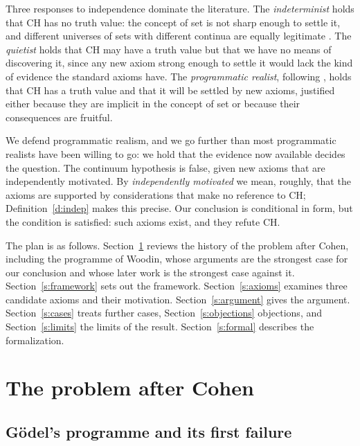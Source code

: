 \documentclass{situationist-preprint}
\begin{document}
Three responses to independence dominate the literature. The \emph{indeterminist} holds that CH has no truth value: the concept of set is not sharp enough to settle it, and different universes of sets with different continua are equally legitimate \citep{Hamkins2012}. The \emph{quietist} holds that CH may have a truth value but that we have no means of discovering it, since any new axiom strong enough to settle it would lack the kind of evidence the standard axioms have. The \emph{programmatic realist}, following \citet{Godel1947}, holds that CH has a truth value and that it will be settled by new axioms, justified either because they are implicit in the concept of set or because their consequences are fruitful.

We defend programmatic realism, and we go further than most programmatic realists have been willing to go: we hold that the evidence now available decides the question. The continuum hypothesis is false, given new axioms that are independently motivated. By \emph{independently motivated} we mean, roughly, that the axioms are supported by considerations that make no reference to CH; Definition~\ref{d:indep} makes this precise. Our conclusion is conditional in form, but the condition is satisfied: such axioms exist, and they refute CH.

The plan is as follows. Section~\ref{s:history} reviews the history of the problem after Cohen, including the programme of Woodin, whose arguments are the strongest case for our conclusion and whose later work is the strongest case against it. Section~\ref{s:framework} sets out the framework. Section~\ref{s:axioms} examines three candidate axioms and their motivation. Section~\ref{s:argument} gives the argument. Section~\ref{s:cases} treats further cases, Section~\ref{s:objections} objections, and Section~\ref{s:limits} the limits of the result. Section~\ref{s:formal} describes the formalization.

\section{The problem after Cohen}\label{s:history}

\subsection{Gödel's programme and its first failure}
\end{document}
